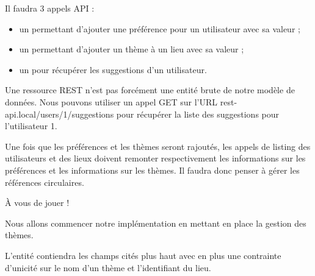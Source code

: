 \documentclass[big]{zmdocument}
\begin{document}
Il faudra 3 appels API :



\begin{itemize}
\item un permettant d'ajouter une préférence pour un utilisateur avec sa valeur ;
\item un permettant d'ajouter un thème à un lieu avec sa valeur ;
\item un pour récupérer les suggestions d'un utilisateur.
\end{itemize}


\begin{Information}
Une ressource REST n'est pas forcément une entité brute de notre modèle de données. Nous pouvons utiliser un appel GET sur l'URL rest-api.local/users/1/suggestions pour récupérer la liste des suggestions pour l'utilisateur 1.
\end{Information}


Une fois que les préférences et les thèmes seront rajoutés, les appels de listing des utilisateurs et des lieux doivent remonter respectivement les informations sur les préférences et les informations sur les thèmes. Il faudra donc penser à gérer les références circulaires.



À vous de jouer !







Nous allons commencer notre implémentation en mettant en place la gestion des thèmes.



L'entité contiendra les champs cités plus haut avec en plus une contrainte d'unicité sur le nom d'un thème et l'identifiant du lieu.
\end{document}
